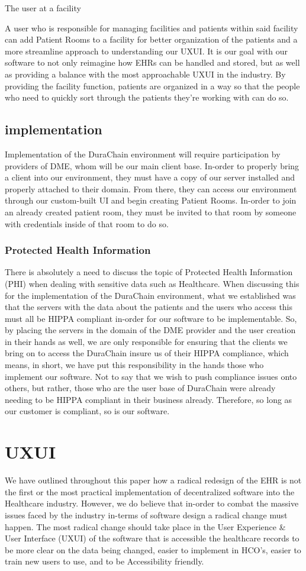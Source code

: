 \documentclass[letterpaper]{article}
\begin{document}
The user at a facility


 A user who is responsible for managing facilities and patients within said facility can add Patient Rooms to a facility for better organization of the patients and a more streamline approach to understanding our UXUI. It is our goal with our software to not only reimagine how EHRs can be handled and stored, but as well as providing a balance with the most approachable UXUI in the industry. By providing the facility function, patients are organized in a way so that the people who need to quickly sort through the patients they’re working with can do so.
%
\subsection{implementation}
Implementation of the DuraChain environment will require participation by providers of DME, whom will be our main client base. In-order to properly bring a client into our environment, they must have a copy of our server installed and properly attached to their domain. From there, they can access our environment through our custom-built UI and begin creating Patient Rooms. In-order to join an already created patient room, they must be invited to that room by someone with credentials inside of that room to do so.
%
\subsubsection{Protected Health Information}
There is absolutely a need to discuss the topic of Protected Health Information (PHI) when dealing with sensitive data such as Healthcare. When discussing this for the implementation of the DuraChain environment, what we established was that the servers with the data about the patients and the users who access this must all be HIPPA compliant in-order for our software to be implementable. So, by placing the servers in the domain of the DME provider and the user creation in their hands as well, we are only responsible for ensuring that the clients we bring on to access the DuraChain insure us of their HIPPA compliance, which means, in short, we have put this responsibility in the hands those who implement our software. Not to say that we wish to push compliance issues onto others, but rather, those who are the user base of DuraChain were already needing to be HIPPA compliant in their business already. Therefore, so long as our customer is compliant, so is our software.
%
\section{UXUI}
We have outlined throughout this paper how a radical redesign of the EHR is not the first or the most practical implementation of decentralized software into the Healthcare industry. However, we do believe that in-order to combat the massive issues faced by the industry in-terms of software design a radical change must happen. The most radical change should take place in the User Experience & User Interface (UXUI) of the software that is accessible the healthcare records to be more clear on the data being changed, easier to implement in HCO’s, easier to train new users to use, and to be Accessibility friendly.
%
\end{document}
